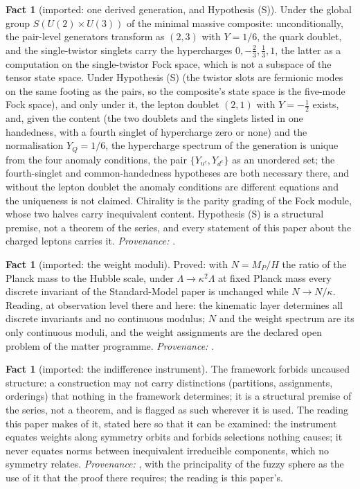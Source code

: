 \documentclass[11pt]{article}
\theoremstyle{definition}
\newtheorem{fact}[theorem]{Fact}
\begin{document}
\begin{fact}[imported: one derived generation, and Hypothesis (S)]\label{fact:generation}
Under the global group $S(U(2) \times U(3))$ of the minimal massive composite: unconditionally, the pair-level generators transform as $(2,3)$ with $Y = 1/6$, the quark doublet, and the single-twistor singlets carry the hypercharges $0, -\tfrac23, \tfrac13, 1$, the latter as a computation on the single-twistor Fock space, which is not a subspace of the tensor state space. Under Hypothesis (S) (the twistor slots are fermionic modes on the same footing as the pairs, so the composite's state space is the five-mode Fock space), and only under it, the lepton doublet $(2,1)$ with $Y = -\tfrac12$ exists, and, given the content (the two doublets and the singlets listed in one handedness, with a fourth singlet of hypercharge zero or none) and the normalisation $Y_{Q} = 1/6$, the hypercharge spectrum of the generation is unique from the four anomaly conditions, the pair $\{Y_{u^{c}}, Y_{d^{c}}\}$ as an unordered set; the fourth-singlet and common-handedness hypotheses are both necessary there, and without the lepton doublet the anomaly conditions are different equations and the uniqueness is not claimed. Chirality is the parity grading of the Fock module, whose two halves carry inequivalent content. Hypothesis (S) is a structural premise, not a theorem of the series, and every statement of this paper about the charged leptons carries it. \emph{Provenance:} \cite[\S4-\S5, in particular Prop.~5.3, Thm.~5.5, Prop.~5.6]{ButlerT12}.
\end{fact}

\begin{fact}[imported: the weight moduli]\label{fact:moduli}
Proved: with $N = M_{P}/H$ the ratio of the Planck mass to the Hubble scale, under $\Lambda \to \kappa^{2}\Lambda$ at fixed Planck mass every discrete invariant of the Standard-Model paper is unchanged while $N \to N/\kappa$. Reading, at observation level there and here: the kinematic layer determines all discrete invariants and no continuous modulus; $N$ and the weight spectrum are its only continuous moduli, and the weight assignments are the declared open problem of the matter programme. \emph{Provenance:} \cite[Prop.~7.6(1) and successor problem (3)]{ButlerT12}.
\end{fact}

\begin{fact}[imported: the indifference instrument]\label{fact:indifference}
The framework forbids uncaused structure: a construction may not carry distinctions (partitions, assignments, orderings) that nothing in the framework determines; it is a structural premise of the series, not a theorem, and is flagged as such wherever it is used. The reading this paper makes of it, stated here so that it can be examined: the instrument equates weights along symmetry orbits and forbids selections nothing causes; it never equates norms between inequivalent irreducible components, which no symmetry relates. \emph{Provenance:} \cite[Principle~5.4]{ButlerT8}, with the principality of the fuzzy sphere \cite[Thm.~5.5]{ButlerT8} as the use of it that the proof there requires; the reading is this paper's.
\end{fact}
\end{document}
